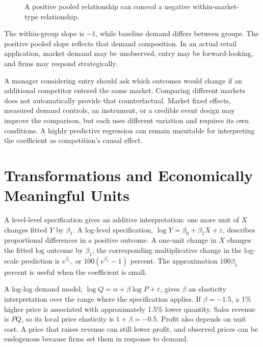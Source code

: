 \begin{figure}[htbp]
\centering

\caption{A positive pooled relationship can conceal a negative within-market-type relationship.}\label{fig:M03_omitted_demand}
\end{figure}

The within-group slope is \(-1\), while baseline demand differs between
groups. The positive pooled slope reflects that demand composition. In
an actual retail application, market demand may be unobserved, entry may
be forward-looking, and firms may respond strategically.

A manager considering entry should ask which outcomes would change if an
additional competitor entered the same market. Comparing different
markets does not automatically provide that counterfactual. Market fixed
effects, measured demand controls, an instrument, or a credible event
design may improve the comparison, but each uses different variation and
requires its own conditions. A highly predictive regression can remain
unsuitable for interpreting the coefficient as competition's causal
effect.

\hypertarget{M03-transformations-and-economically-meaningful-units}{%
\section{Transformations and Economically Meaningful
Units}\label{M03-transformations-and-economically-meaningful-units}}

\noindent A level-level specification gives an additive interpretation: one more
unit of \(X\) changes fitted \(Y\) by \(\beta_1\). A log-level
specification, \(\log Y=\beta_0+\beta_1X+\varepsilon\), describes
proportional differences in a positive outcome. A one-unit change in
\(X\) changes the fitted log outcome by \(\beta_1\); the corresponding
multiplicative change in the log-scale prediction is \(e^{\beta_1}\), or
\(100(e^{\beta_1}-1)\) percent. The approximation \(100\beta_1\) percent
is useful when the coefficient is small.

A log-log demand model, \(\log Q=\alpha+\beta\log P+\varepsilon\), gives
\(\beta\) an elasticity interpretation over the range where the
specification applies. If \(\beta=-1.5\), a 1\% higher price is
associated with approximately 1.5\% lower quantity. Sales revenue is
\(PQ\), so its local price elasticity is \(1+\beta=-0.5\). Profit also
depends on unit cost. A price that raises revenue can still lower
profit, and observed prices can be endogenous because firms set them in
response to demand.

